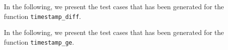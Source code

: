 In the following, we present the test cases that has been generated for the function \texttt{timestamp\_diff}.





In the following, we present the test cases that has been generated for the function \texttt{timestamp\_ge}.


